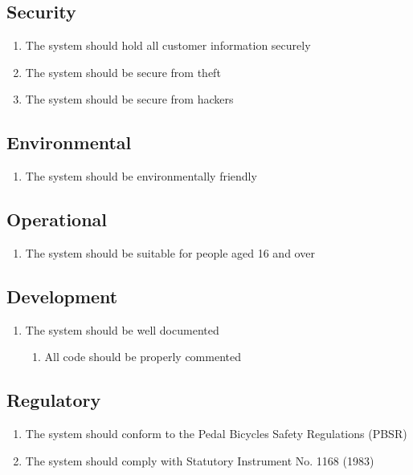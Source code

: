 \documentclass[a4paper]{report}
\begin{document}
\subsection{Security}
\label{security}
\begin{enumerate}[label=\ref*{security}.\arabic*.,leftmargin=*]
\item The system should hold all customer information securely
\item The system should be secure from theft
\item The system should be secure from hackers
\end{enumerate}
\subsection{Environmental}
\label{environmental}
\begin{enumerate}[label=\ref*{environmental}.\arabic*.,leftmargin=*]
\item The system should be environmentally friendly
\end{enumerate}
\subsection{Operational}
\label{operational}
\begin{enumerate}[label=\ref*{operational}.\arabic*.,leftmargin=*]
\item The system should be suitable for people aged 16 and over
\end{enumerate}
\subsection{Development}
\label{development}
\begin{enumerate}[label=\ref*{development}.\arabic*.,leftmargin=*]
\item The system should be well documented
\begin{enumerate}[label*=\arabic*.]
\item All code should be properly commented
\end{enumerate}
\end{enumerate}
\subsection{Regulatory}
\label{regulatory}
\begin{enumerate}[label=\ref*{regulatory}.\arabic*.,leftmargin=*]
\item The system should conform to the Pedal Bicycles Safety Regulations (PBSR)
\item The system should comply with Statutory Instrument No. 1168 (1983)
\end{enumerate}
\end{document}
